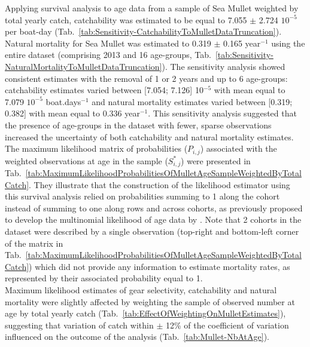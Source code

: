 Applying survival analysis to age data from a sample of Sea Mullet weighted by total yearly catch, catchability was estimated to be equal to 7.055 $\pm$ 2.724 $10^{-5}$ per boat-day (Tab.~\ref{tab:Sensitivity-CatchabilityToMulletDataTruncation}). Natural mortality for Sea Mullet was estimated to 0.319 $\pm$ 0.165 year$^{-1}$ using the entire dataset (comprising 2013 and 16 age-groups, Tab.~\ref{tab:Sensitivity-NaturalMortalityToMulletDataTruncation}). The sensitivity analysis showed consistent estimates with the removal of 1 or 2 years and up to 6 age-groups: catchability estimates varied between [7.054; 7.126] 10$^{-5}$ with mean equal to 7.079 $10^{-5}$ boat.days$^{-1}$ and natural mortality estimates varied between [0.319; 0.382] with mean equal to 0.336 year$^{-1}$. This sensitivity analysis suggested that the presence of age-groups in the dataset with fewer, sparse observations increased the uncertainty of both catchability and natural mortality estimates.\\

The maximum likelihood matrix of probabilities ($P_{i,j}$) associated with the weighted observations at age in the sample ($S^{*}_{i,j}$) were presented in Tab.~\ref{tab:MaximumLikelihoodProbabilitiesOfMulletAgeSampleWeightedByTotalCatch}. They illustrate that the construction of the likelihood estimator using this survival analysis relied on probabilities summing to 1 along the cohort instead of summing to one along rows and across cohorts, as previously proposed to develop the multinomial likelihood of age data by \cite{Four82a}. Note that 2 cohorts in the dataset were described by a single observation (top-right and bottom-left corner of the matrix in Tab.~\ref{tab:MaximumLikelihoodProbabilitiesOfMulletAgeSampleWeightedByTotalCatch}) which did not provide any information to estimate mortality rates, as represented by their associated probability equal to 1.\\

Maximum likelihood estimates of gear selectivity, catchability and natural mortality were slightly affected by weighting the sample of observed number at age by total yearly catch (Tab.~\ref{tab:EffectOfWeightingOnMulletEstimates}), suggesting that variation of catch within $\pm$ 12\% of the coefficient of variation influenced on the outcome of the analysis (Tab.~\ref{tab:Mullet-NbAtAge}).

